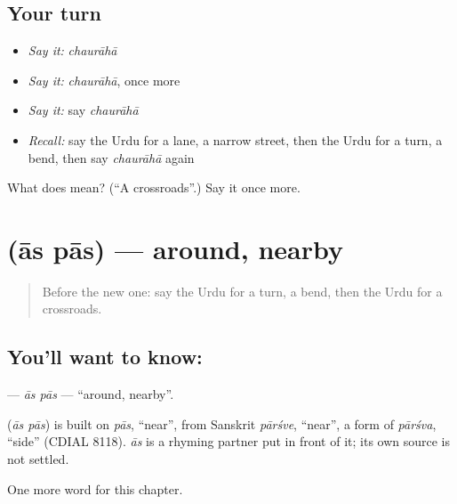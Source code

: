 \subsection*{Your turn}
\begin{itemize}
\raggedright
  \item \emph{Say it:} \emph{chaurāhā}
  \item \emph{Say it:} \emph{chaurāhā}, once more
  \item \emph{Say it:} say \emph{chaurāhā}
  \item \emph{Recall:} say the Urdu for a lane, a narrow street, then the Urdu for a turn, a bend, then say \emph{chaurāhā} again
\end{itemize}

\begin{tcolorbox}[breakable,colback=teal!4,colframe=teal!35!black,title={Before you move on}]
What does  mean? (\textquotedblleft{}A crossroads\textquotedblright{}.) Say it once more.
\end{tcolorbox}
\section[\texorpdfstring{\ur{آس} \ur{پاس} (ās pās)}{آس پاس (ās pās)}]{  (ās pās) — around, nearby}

\label{lesson:UR-C100-aspas}



\begin{quote}
Before the new one: say the Urdu for a turn, a bend, then the Urdu for a crossroads.
\end{quote}

\subsection*{You'll want to know:  }
\textbf{ } — \emph{ās pās} — \textquotedblleft{}around, nearby\textquotedblright{}.

\begin{cousinweb}
\textbf{ } (\emph{ās pās}) is built on \emph{pās}, \textquotedblleft{}near\textquotedblright{}, from Sanskrit \emph{pārśve}, \textquotedblleft{}near\textquotedblright{}, a form of \emph{pārśva}, \textquotedblleft{}side\textquotedblright{} (CDIAL 8118). \emph{ās} is a rhyming partner put in front of it; its own source is not settled.
\end{cousinweb}

\begin{grammarlens}[title={What you've built}]
One more word for this chapter.
\end{grammarlens}

